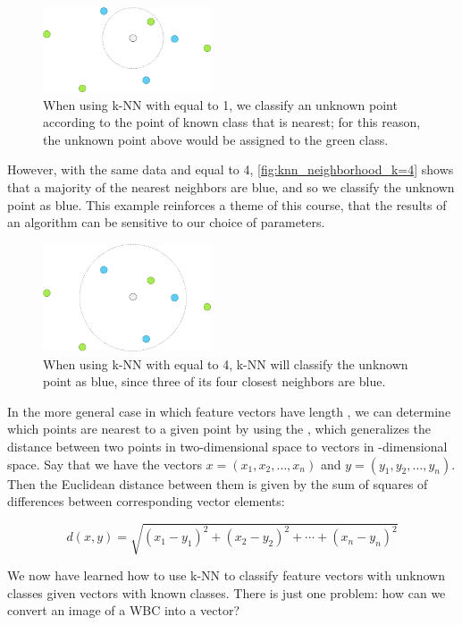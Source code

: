 \begin{figure}[h]
\centering
\mySfFamily
\includegraphics[width = 0.444\textwidth]{../images/knn_neighborhood_k=1.png}
\caption{When using k-NN with  equal to 1, we classify an unknown point according to the point of known class that is nearest; for this reason, the unknown point above would be assigned to the green class.}
\label{fig:knn_neighborhood_k=1}
\end{figure}

However, with the same data and  equal to 4, \autoref{fig:knn_neighborhood_k=4} shows that a majority of the  nearest neighbors are blue, and so we classify the unknown point as blue. This example reinforces a theme of this course, that the results of an algorithm can be sensitive to our choice of parameters.\\

\begin{figure}[h]
\centering
\mySfFamily
\includegraphics[width = 0.444\textwidth]{../images/knn_neighborhood_k=4.png}
\caption{When using k-NN with  equal to 4, k-NN will classify the unknown point as blue, since three of its four closest neighbors are blue.}
\label{fig:knn_neighborhood_k=4}
\end{figure}

\begin{qbox}[%
When \textvar{k} = 2 or \textvar{k} = 6 for the classification of the point in \autoref{fig:knn_neighborhood}, note that we obtain a tie in the number of points from each known class belonging to the \textvar{k} nearest neighbors of a point with unknown class. How could we break ties in k-NN?
]\end{qbox}

In the more general case in which feature vectors have length , we can determine which points are nearest to a given point by using the , which generalizes the distance between two points in two-dimensional space to vectors in -dimensional space. Say that we have the vectors $x = (x_1, x_2, \ldots, x_n)$ and $y = (y_1, y_2, \ldots, y_n)$. Then the Euclidean distance between them is given by the sum of squares of differences between corresponding vector elements:

$$d(x, y) = \sqrt{(x_1 - y_1)^2 + (x_2 - y_2)^2 + \cdots + (x_n-y_n)^2}$$

We now have learned how to use k-NN to classify feature vectors with unknown classes given vectors with known classes. There is just one problem: how can we convert an image of a WBC into a vector?